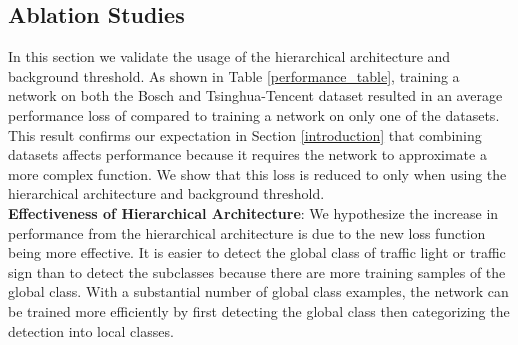 \documentclass[10pt, conference, compsocconf]{IEEEtran}
\begin{document}
\begin{table}[t]
\centering
{}
\caption{Accuracy (A) and recall (R) comparison with the Tsinghua-Tencent state-of-the-art detectors. \cite{meng} only cites an overall accuracy and recall.}
\label{tencent_compare}
\end{table}


\subsection{Ablation Studies}
In this section we validate the usage of the hierarchical architecture and background threshold. As shown in Table \ref{performance_table}, training a network on both the Bosch and Tsinghua-Tencent dataset resulted in an average performance loss of  compared to training a network on only one of the datasets. This result confirms our expectation in Section \ref{introduction} that combining datasets affects performance because it requires the network to approximate a more complex function. We show that this loss is reduced to only  when using the hierarchical architecture and background threshold. \\

\noindent\textbf{Effectiveness of Hierarchical Architecture}: We hypothesize the increase in performance from the hierarchical architecture is due to the new loss function being more effective. It is easier to detect the global class of traffic light or traffic sign than to detect the subclasses because there are more training samples of the global class. With a substantial number of global class examples, the network can be trained more efficiently by first detecting the global class then categorizing the detection into local classes.\\
\end{document}
